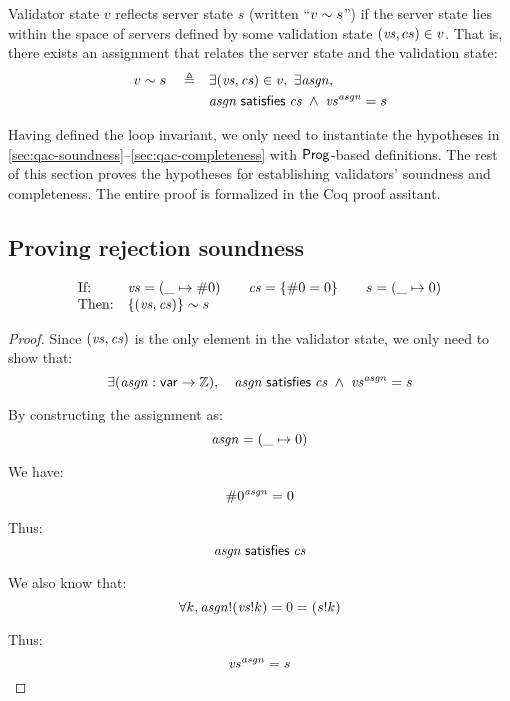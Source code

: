 \begin{definition}
Validator state $v$ reflects server state $s$ (written ``$v\sim s$'') if
the server state lies within the space of servers defined by some validation
state $(\mathit{vs},cs)\in v$.  That is, there exists an assignment that relates the
server state and the validation state:
\begin{align*}
v\sim s\quad\triangleq\quad&\exists(\mathit{vs},\mathit{cs})\in
  v,\;\exists\mathit{asgn},\\
  &\mathit{asgn}\;\mathsf{satisfies}\;\mathit{cs}\;\wedge\;\mathit{vs}^{\mathit{asgn}}=s
  \end{align*}
\end{definition}

Having defined the loop invariant, we only need to instantiate the hypotheses
in \autoref{sec:qac-soundness}--\ref{sec:qac-completeness} with $\mathsf{Prog}$-based
definitions.  The rest of this section proves the hypotheses for establishing
validators' soundness and completeness.  The entire proof is formalized in the
Coq proof assitant.

\subsection{Proving rejection soundness}
\label{sec:proof-sound}
\begin{lemma}[\ref{eq:rs1}]
\[\begin{array}{ll}
\text{If:}&
\mathit{vs}=(\_\mapsto\#0)\qquad
\mathit{cs}=\{\#0=0\}\qquad
s=(\_\mapsto0)\\
\text{Then:}&\{(\mathit{vs},\mathit{cs})\}\sim s
\end{array}\]
\end{lemma}
\begin{proof}
Since $(\mathit{vs},\mathit{cs})$ is the only element in the validator state, we only need to show
that:
\[\exists(\mathit{asgn}:\mathsf{var}\to\mathbb Z),\quad\mathit{asgn}\;\mathsf{satisfies}\;\mathit{cs}\;\wedge\;\mathit{vs}^{\mathit{asgn}}=s\]

By constructing the assignment as: \[\mathit{asgn}=(\_\mapsto0)\]

We have: \[\#0^{\mathit{asgn}}=0\]

Thus: \[\mathit{asgn}\;\mathsf{satisfies}\;\mathit{cs}\]

We also know that: \[\forall k, \mathit{asgn}!(\mathit{vs}!k)=0=(s!k)\]

Thus: \[\mathit{vs}^{\mathit{asgn}}=s\qedhere\]
\end{proof}


